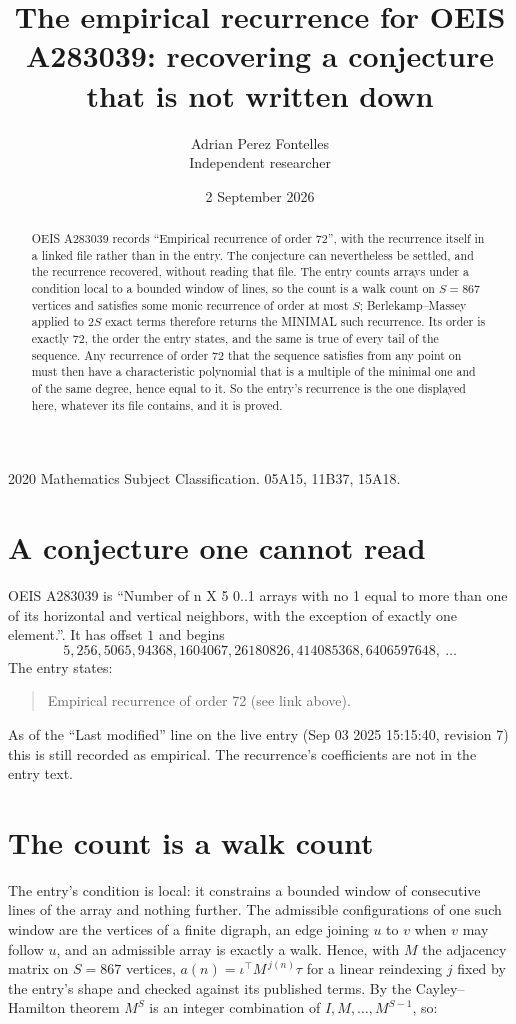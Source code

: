 \documentclass[11pt,a4paper]{article}
\title{The empirical recurrence for OEIS A283039: recovering a conjecture that is not written down}
\author{Adrian Perez Fontelles\\ \small Independent researcher}
\date{2 September 2026}
\theoremstyle{plain}
\theoremstyle{definition}
\begin{document}
\maketitle

\begin{abstract}
OEIS A283039 records ``Empirical recurrence of order $72$'', with the recurrence itself in a
linked file rather than in the entry. The conjecture can nevertheless be settled, and the
recurrence recovered, without reading that file. The entry counts arrays under a condition
local to a bounded window of lines, so the count is a walk count on $S=867$ vertices and
satisfies some monic recurrence of order at most $S$; Berlekamp--Massey applied to $2S$ exact
terms therefore returns the MINIMAL such recurrence. Its order is exactly $72$, the order
the entry states, and the same is true of every tail of the sequence. Any recurrence of order
$72$ that the sequence satisfies from any point on must then have a characteristic
polynomial that is a multiple of the minimal one and of the same degree, hence equal to it. So
the entry's recurrence is the one displayed here, whatever its file contains, and it is
proved.
\end{abstract}

\noindent\small 2020 Mathematics Subject Classification. 05A15, 11B37, 15A18.\normalsize

\section{A conjecture one cannot read}

OEIS A283039 is ``Number of n X 5 0..1 arrays with no 1 equal to more than one of its horizontal and vertical neighbors, with the exception of exactly one element.''. It has offset $1$ and begins
\[
5, 256, 5065, 94368, 1604067, 26180826, 414085368, 6406597648,\ \dots
\]
The entry states:
\begin{quote}
Empirical recurrence of order 72 (see link above).
\end{quote}
As of the ``Last modified'' line on the live entry (Sep 03 2025 15:15:40, revision 7) this is still
recorded as empirical. The recurrence's coefficients are not in the entry text.

\section{The count is a walk count}

The entry's condition is local: it constrains a bounded window of consecutive lines of the
array and nothing further. The admissible configurations of one such window are the vertices
of a finite digraph, an edge joining $u$ to $v$ when $v$ may follow $u$, and an admissible
array is exactly a walk. Hence, with $M$ the adjacency matrix on $S=867$ vertices,
$a(n)=\iota^{\!\top}M^{\,j(n)}\tau$ for a linear reindexing $j$ fixed by the entry's shape
and checked against its published terms. By the Cayley--Hamilton theorem $M^{S}$ is an
integer combination of $I,M,\dots,M^{S-1}$, so:
\end{document}
